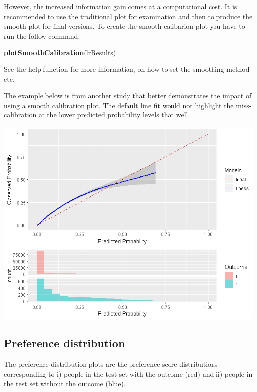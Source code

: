 \documentclass[]{book}
\newenvironment{Shaded}{\begin{snugshade}}{\end{snugshade}}
\newcommand{\KeywordTok}[1]{\textcolor[rgb]{0.13,0.29,0.53}{\textbf{#1}}}
\newcommand{\NormalTok}[1]{#1}
\begin{document}
However, the increased information gain comes at a computational cost.
It is recommended to use the traditional plot for examination and then
to produce the smooth plot for final versions. To create the smooth
calibarion plot you have to run the follow command:

\begin{Shaded}
\begin{Highlighting}[]
\KeywordTok{plotSmoothCalibration}\NormalTok{(lrResults)}
\end{Highlighting}
\end{Shaded}

See the help function for more information, on how to set the smoothing
method etc.

The example below is from another study that better demonstrates the
impact of using a smooth calibration plot. The default line fit would
not highlight the miss-calibration at the lower predicted probability
levels that well.

\includegraphics[width=1\linewidth]{images/PatientLevelPrediction/smoothCalibration}

\newpage

\subsection{Preference distribution}\label{preference-distribution}

The preference distribution plots are the preference score distributions
corresponding to i) people in the test set with the outcome (red) and
ii) people in the test set without the outcome (blue).
\end{document}
